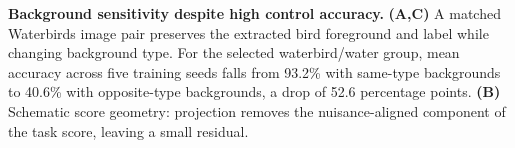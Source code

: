 \textbf{Background sensitivity despite high control accuracy.} \textbf{(A,C)} A matched Waterbirds image pair preserves the extracted bird foreground and label while changing background type. For the selected waterbird/water group, mean accuracy across five training seeds falls from 93.2\% with same-type backgrounds to 40.6\% with opposite-type backgrounds, a drop of 52.6 percentage points. \textbf{(B)} Schematic score geometry: projection removes the nuisance-aligned component of the task score, leaving a small residual.
